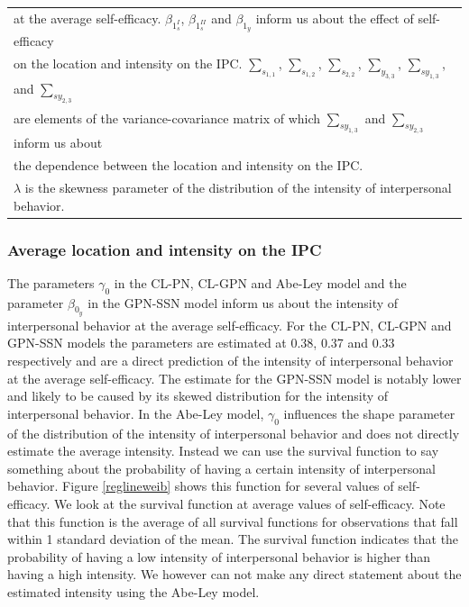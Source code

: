 \documentclass[man,mask]{apa6}
\begin{document}
\begin{table}
\begin{tabular}[t]{lllllll}
\multicolumn{7}{l}{at the average self-efficacy. $\beta_{1_s^{I}}$, $\beta_{1_s^{II}}$ and $\beta_{1_y}$ inform us about the effect of self-efficacy }\\
\multicolumn{7}{l}{on the location and intensity on the IPC. $\sum_{s_{1,1}}$, $\sum_{s_{1,2}}$, $\sum_{s_{2,2}}$, $\sum_{y_{3,3}}$, $\sum_{sy_{1,3}}$,  and $\sum_{sy_{2,3}}$ }\\
\multicolumn{7}{l}{are elements of the variance-covariance matrix of which $\sum_{sy_{1,3}}$ and $\sum_{sy_{2,3}}$ inform us about}\\
\multicolumn{7}{l}{the dependence between the location and intensity on the IPC.}\\
\multicolumn{7}{l}{$\lambda$ is the skewness parameter of the distribution of the intensity of interpersonal behavior.}\\
\end{tabular}
\end{table}

\subsubsection{Average location and intensity on the IPC}

The parameters \(\gamma_0\) in the CL-PN, CL-GPN and Abe-Ley model and the
parameter \(\beta_{0_y}\) in the GPN-SSN model inform us about the intensity of
interpersonal behavior at the average self-efficacy. For the CL-PN, CL-GPN and
GPN-SSN models the parameters are estimated at 0.38, 0.37 and 0.33 respectively
and are a direct prediction of the intensity of interpersonal behavior at the
average self-efficacy. The estimate for the GPN-SSN model is notably lower and
likely to be caused by its skewed distribution for the intensity of
interpersonal behavior. In the Abe-Ley model, \(\gamma_0\) influences the shape
parameter of the distribution of the intensity of interpersonal behavior and does
not directly estimate the average intensity. Instead we can use the survival
function to say something about the probability of having a certain intensity of
interpersonal behavior. Figure \ref{reglineweib} shows this function for several
values of self-efficacy. We look at the survival function at average values of
self-efficacy. Note that this function is the average of all survival functions
for observations that fall within 1 standard deviation of the mean. The survival
function indicates that the probability of having a low intensity of
interpersonal behavior is higher than having a high intensity. We however can not
make any direct statement about the estimated intensity using the Abe-Ley
model.
\end{document}

